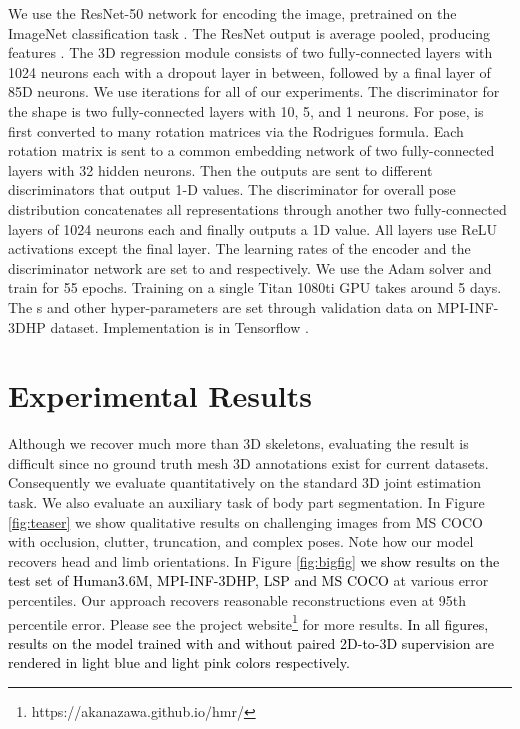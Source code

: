 \documentclass[10pt,twocolumn,letterpaper]{article}
\newcommand{\blue}[1]{\textcolor{black}{#1}}
\begin{document}
\label{sec:architecture}
We use the ResNet-50 network \cite{He2016} for encoding the image,
pretrained on the ImageNet classification task \cite{tfslim}. The ResNet output is
average pooled, producing features . The 3D regression module
consists of two fully-connected layers with 1024 neurons each with
a dropout layer in between, followed by a final layer of 85D neurons. We use  iterations for all of our experiments.
The discriminator for the shape is two fully-connected layers with 10, 5, and 1
neurons. For pose,  is first converted to  many  rotation matrices
via the Rodrigues formula. Each rotation matrix is sent to a common embedding
network of two fully-connected layers with 32 hidden neurons. Then the outputs
are sent to  different discriminators that output 1-D values. The
discriminator for overall pose distribution concatenates all
 representations through another two fully-connected layers of 1024
neurons each and finally outputs a 1D value.  
All layers use ReLU activations except the final layer. 
The learning rates of the encoder and the discriminator network are set
to  and  respectively. We use the Adam
solver \cite{Adam} and train for 55 epochs. Training on a single Titan 1080ti
GPU takes around 5 days. The s and other hyper-parameters are set
through validation data on MPI-INF-3DHP dataset. Implementation is in Tensorflow \cite{tf}. 


 \section{Experimental Results}
\label{sec:exp}
Although we recover much more than 3D skeletons, evaluating the result
is difficult since no ground truth mesh 3D annotations exist for
current datasets. Consequently we evaluate quantitatively on the standard 3D joint 
estimation task. We also evaluate an auxiliary task of body part
segmentation. In Figure \ref{fig:teaser} we show qualitative results on
challenging images from MS COCO \cite{coco} with occlusion, clutter, truncation,
and complex poses. Note how our model recovers head and limb
orientations. In Figure \ref{fig:bigfig} \blue{we show results on
  the test set of Human3.6M, MPI-INF-3DHP, LSP and MS COCO} at various error
percentiles. Our approach recovers reasonable reconstructions even at 95th percentile error. Please see the project
website\footnote{https://akanazawa.github.io/hmr/} for more results. \blue{In
  all figures, results on the model trained with and without paired 2D-to-3D
supervision are rendered in light blue and light pink colors respectively.}
\end{document}
